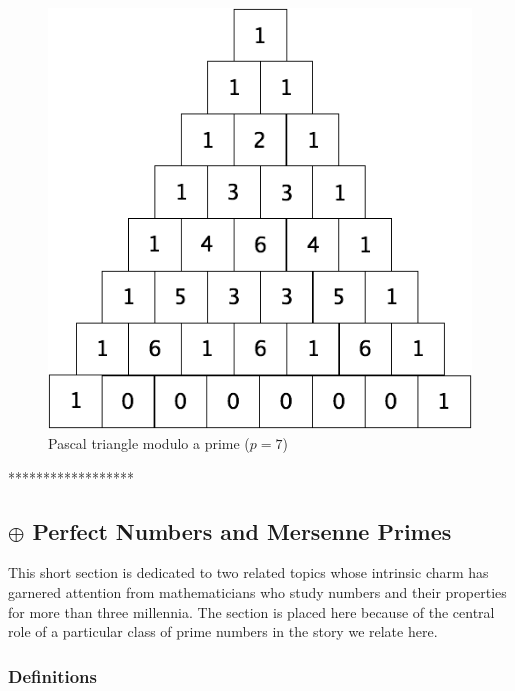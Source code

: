 {\begin{figure}[ht]
\begin{center}
        \includegraphics[scale=0.3]{FiguresArithmetic/TrianglePascalModulo7.png}
        \caption{Pascal triangle modulo a prime ($p=7$)}
        \label{fig:TriangleModulo7}
\end{center}
\end{figure}
******************}


\subsection{$\oplus$  Perfect Numbers and Mersenne Primes}
\label{sec:perfect-numbers+Mersenne-primes}

This short section is dedicated to two related topics whose intrinsic
charm has garnered attention from mathematicians who study numbers and
their properties for more than three millennia.  The section is placed
here because of the central role of a particular class of prime
numbers in the story we relate here.

\subsubsection{Definitions}
\label{sec:perfect-numbers}
\label{sec:Mersenne-primes}

